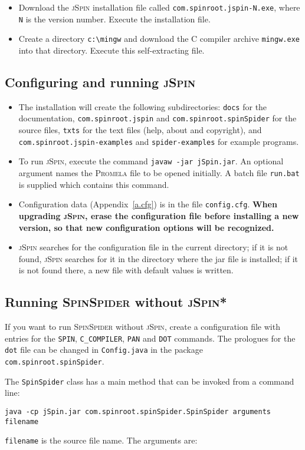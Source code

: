 \documentclass[11pt]{article}
\newcommand{\prm}{\textsc{Promela}}
\newcommand{\js}{\textsc{jSpin}}
\newcommand{\spd}{\textsc{SpinSpider}}
\newcommand{\dtf}{\texttt{dot}}
\newcommand{\p}[1]{\texttt{#1}}
\begin{document}
\begin{itemize}
\item Download the \js{} installation file called \p{com.spinroot.jspin-N.exe},
where \p{N} is the version number.
Execute the installation file.
\item Create a directory \verb=c:\mingw= and download the C 
compiler archive \p{mingw.exe} into that directory. Execute this self-extracting file.
\end{itemize}

\subsection{Configuring and running \js{}}
\begin{itemize}
\item The installation will create the following subdirectories: \p{docs} for the
documentation, \p{com.spinroot.jspin} and \p{com.spinroot.spinSpider} for the source files,
\p{txts} for the text files
(help, about and copyright), and \p{com.spinroot.jspin-examples} and \p{spider-examples}
for example programs.
\item To run \js{}, execute the command \p{javaw -jar jSpin.jar}.
An optional argument names the \prm{} file to be opened initially.
A batch file \p{run.bat} is supplied which contains this command.
\item Configuration data (Appendix~\ref{a.cfg}) is in the file
\p{config.cfg}.
\textbf{When upgrading \js{}, erase the configuration file before installing
a new version, so that new configuration options will be recognized.}
\item \js{} searches for the configuration file in the current
directory; if it is not found, \js{} searches for it in the directory
where the jar file is installed; if it is not found there, a new file
with default values is written.
\end{itemize}

\subsection{Running \spd{} without \js{}*}
If you want to run \spd{} without \js{}, create a configuration file
with entries for the \p{SPIN}, \p{C\_COMPILER}, \p{PAN} and \p{DOT}
commands. The prologues for the \dtf{} file can be changed in
\p{Config.java} in the package \p{com.spinroot.spinSpider}.

The \p{SpinSpider} class has a main method that can be invoked from a command
line:
\begin{verbatim}
java -cp jSpin.jar com.spinroot.spinSpider.SpinSpider arguments filename
\end{verbatim}
\p{filename} is the source file name. The arguments are:
\end{document}
